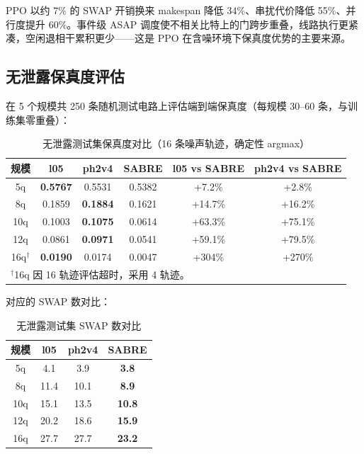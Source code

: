 PPO 以约 7\% 的 SWAP 开销换来 makespan 降低 34\%、串扰代价降低 55\%、并行度提升 60\%。事件级 ASAP 调度使不相关比特上的门跨步重叠，线路执行更紧凑，空闲退相干累积更少——这是 PPO 在含噪环境下保真度优势的主要来源。

\subsection{无泄露保真度评估}
\label{sec:no-leakage-eval}

在 5 个规模共 250 条随机测试电路上评估端到端保真度（每规模 30--60 条，与训练集零重叠）：

\begin{table}[htbp]
\centering
\caption{无泄露测试集保真度对比（16 条噪声轨迹，确定性 argmax）}
\label{tab:no-leakage-fidelity}
\small
\begin{tabular}{c|ccc|cc}
\hline
规模 & l05 & ph2v4 & SABRE & l05 vs SABRE & ph2v4 vs SABRE \\
\hline
5q & \textbf{0.5767} & 0.5531 & 0.5382 & +7.2\% & +2.8\% \\
8q & 0.1859 & \textbf{0.1884} & 0.1621 & +14.7\% & +16.2\% \\
10q & 0.1003 & \textbf{0.1075} & 0.0614 & +63.3\% & +75.1\% \\
12q & 0.0861 & \textbf{0.0971} & 0.0541 & +59.1\% & +79.5\% \\
16q$^{\dagger}$ & \textbf{0.0190} & 0.0174 & 0.0047 & +304\% & +270\% \\
\hline
\multicolumn{6}{l}{\footnotesize $^{\dagger}$16q 因 16 轨迹评估超时，采用 4 轨迹。} \\
\end{tabular}
\end{table}

对应的 SWAP 数对比：

\begin{table}[htbp]
\centering
\caption{无泄露测试集 SWAP 数对比}
\label{tab:no-leakage-swaps}
\small
\begin{tabular}{c|ccc}
\hline
规模 & l05 & ph2v4 & SABRE \\
\hline
5q & 4.1 & 3.9 & \textbf{3.8} \\
8q & 11.4 & 10.1 & \textbf{8.9} \\
10q & 15.1 & 13.5 & \textbf{10.8} \\
12q & 20.2 & 18.6 & \textbf{15.9} \\
16q & 27.7 & 27.7 & \textbf{23.2} \\
\hline
\end{tabular}
\end{table}

